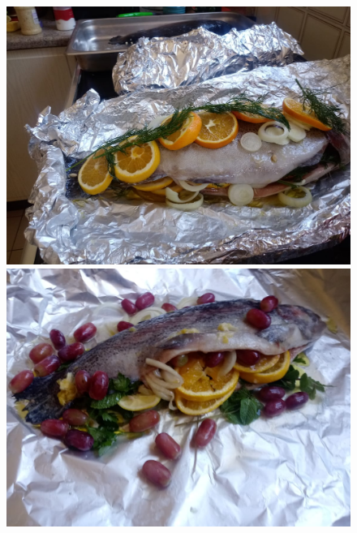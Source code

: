 \begin{figure}[H]
\centering
  \includegraphics[scale=0.15]{recipes/soula_6.jpg} \hspace{0.2cm}  \includegraphics[scale=0.15]{recipes/soula_7.jpg} \\ \vspace{0.2cm}

\end{figure}
